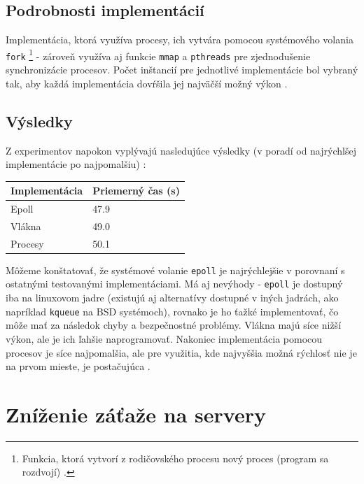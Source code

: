 \documentclass[10pt,twoside,slovak,a4paper]{article}
\begin{document}
\subsection{Podrobnosti implementácií}

Implementácia, ktorá využíva procesy, ich vytvára pomocou systémového volania \texttt{fork} \footnote{Funkcia, ktorá vytvorí z rodičovského procesu nový proces (program sa rozdvojí) \cite{kerrisk2010linux}.} - zároveň využíva aj funkcie \texttt{mmap} a \texttt{pthreads} pre zjednodušenie synchronizácie procesov. Počet inštancií pre jednotlivé implementácie bol vybraný tak, aby každá implementácia dovŕšila jej najväčší možný výkon \cite{9648837}.

\subsection{Výsledky}

Z experimentov napokon vyplývajú nasledujúce výsledky (v poradí od najrýchlšej implementácie po najpomalšiu) \cite{9648837}:

\begin{center}
    \begin{tabular}{|l|l|}
        \hline
        Implementácia & Priemerný čas (s) \\ \hline
        Epoll         & 47.9              \\ \hline
        Vlákna        & 49.0              \\ \hline
        Procesy       & 50.1              \\ \hline
    \end{tabular}
\end{center}

Môžeme konštatovať, že systémové volanie \texttt{epoll} je najrýchlejšie v porovnaní s ostatnými testovanými implementáciami. Má aj nevýhody - \texttt{epoll} je dostupný iba na linuxovom jadre (existujú aj alternatívy dostupné v iných jadrách, ako napríklad \texttt{kqueue} na BSD systémoch), rovnako je ho ťažké implementovať, čo môže mať za následok chyby a bezpečnostné problémy. Vlákna majú síce nižší výkon, ale je ich ľahšie naprogramovať. Nakoniec implementácia pomocou procesov je síce najpomalšia, ale pre využitia, kde najvyššia možná rýchlosť nie je na prvom mieste, je postačujúca \cite{9648837}.

\section{Zníženie záťaže na servery}
\end{document}

